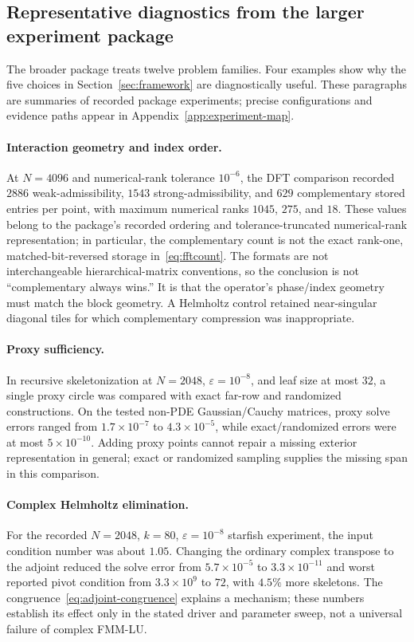 \documentclass[11pt,a4paper]{article}
\newcommand{\eps}{\varepsilon}
\begin{document}
\subsection{Representative diagnostics from the larger experiment package}
The broader package treats twelve problem families. Four examples show why the five choices in Section~\ref{sec:framework} are diagnostically useful. These paragraphs are summaries of recorded package experiments; precise configurations and evidence paths appear in Appendix~\ref{app:experiment-map}.

\paragraph{Interaction geometry and index order.} At $N=4096$ and numerical-rank tolerance $10^{-6}$, the DFT comparison recorded $2886$ weak-admissibility, $1543$ strong-admissibility, and $629$ complementary stored entries per point, with maximum numerical ranks $1045$, $275$, and $18$. These values belong to the package's recorded ordering and tolerance-truncated numerical-rank representation; in particular, the complementary count is not the exact rank-one, matched-bit-reversed storage in~\eqref{eq:fftcount}. The formats are not interchangeable hierarchical-matrix conventions, so the conclusion is not ``complementary always wins.'' It is that the operator's phase/index geometry must match the block geometry. A Helmholtz control retained near-singular diagonal tiles for which complementary compression was inappropriate.

\paragraph{Proxy sufficiency.} In recursive skeletonization at $N=2048$, $\eps=10^{-8}$, and leaf size at most $32$, a single proxy circle was compared with exact far-row and randomized constructions. On the tested non-PDE Gaussian/Cauchy matrices, proxy solve errors ranged from $1.7\times10^{-7}$ to $4.3\times10^{-5}$, while exact/randomized errors were at most $5\times10^{-10}$. Adding proxy points cannot repair a missing exterior representation in general; exact or randomized sampling supplies the missing span in this comparison.

\paragraph{Complex Helmholtz elimination.} For the recorded $N=2048$, $k=80$, $\eps=10^{-8}$ starfish experiment, the input condition number was about $1.05$. Changing the ordinary complex transpose to the adjoint reduced the solve error from $5.7\times10^{-5}$ to $3.3\times10^{-11}$ and worst reported pivot condition from $3.3\times10^9$ to $72$, with $4.5\%$ more skeletons. The congruence~\eqref{eq:adjoint-congruence} explains a mechanism; these numbers establish its effect only in the stated driver and parameter sweep, not a universal failure of complex FMM-LU.
\end{document}
